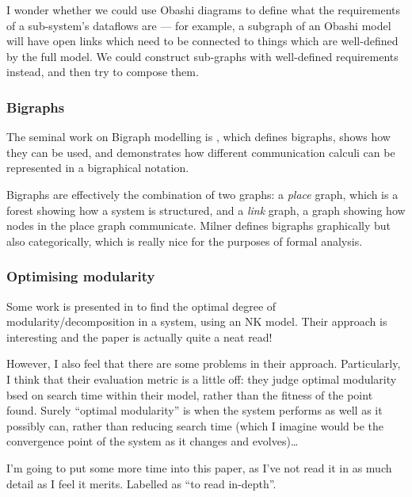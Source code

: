 \documentclass[12pt]{article}
\begin{document}
I wonder whether we could use Obashi diagrams to define what the requirements of
a sub-system's dataflows are --- for example, a subgraph of an Obashi model will
have open links which need to be connected to things which are well-defined by
the full model. We could construct sub-graphs with well-defined requirements
instead, and then try to compose them.\par

\subsubsection{Bigraphs}\label{review:milner2009space}


The seminal work on Bigraph modelling is \cite{milner2009space}, which defines
bigraphs, shows how they can be used, and demonstrates how different
communication calculi can be represented in a bigraphical notation.\par

Bigraphs are effectively the combination of two graphs: a \emph{place} graph,
which is a forest showing how a system is structured, and a \emph{link} graph, a
graph showing how nodes in the place graph communicate. Milner defines bigraphs
graphically but also categorically, which is really nice for the purposes of
formal analysis.\par


\subsubsection{Optimising modularity}

Some work is presented in \cite{frenken2012optimal} to find the optimal degree
of modularity/decomposition in a system, using an NK model. Their approach is
interesting and the paper is actually quite a neat read! 

However, I also feel that there are some problems in their approach.
Particularly, I think that their evaluation metric is a little off: they judge
optimal modularity bsed on search time within their model, rather than the
fitness of the point found. Surely ``optimal modularity'' is when the system
performs as well as it possibly can, rather than reducing search time (which I
imagine would be the convergence point of the system as it changes and
evolves)\ldots\par 

I'm going to put some more time into this paper, as I've not read it in as much
detail as I feel it merits. Labelled as ``to read in-depth''.
\end{document}
